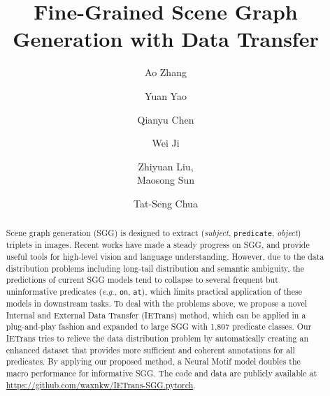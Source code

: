 \documentclass[runningheads]{llncs}
\newcommand{\eg}{\textit{e}.\textit{g}.}
\begin{document}
\pagestyle{headings}
\mainmatter
\def\ECCVSubNumber{2734}  

\title{Fine-Grained Scene Graph Generation with Data Transfer} 

\begin{comment}
\titlerunning{ECCV-22 submission ID \ECCVSubNumber} 
\authorrunning{ECCV-22 submission ID \ECCVSubNumber} 
\author{Anonymous ECCV submission}
\institute{Paper ID \ECCVSubNumber}
\end{comment}


\author{Ao Zhang \and
Yuan Yao \and
Qianyu Chen \and Wei Ji 
\and Zhiyuan Liu, \\ 
 Maosong Sun \and Tat-Seng Chua}

{\let\thefootnote\relax{}}
{\let\thefootnote\relax{}}


\maketitle

\begin{abstract}
Scene graph generation (SGG) is designed to extract (\textit{subject}, \texttt{predicate}, \textit{object}) triplets in images. 
Recent works have made a steady progress on SGG, and provide useful tools for high-level vision and language understanding.
However, due to the data distribution problems including long-tail distribution and semantic ambiguity, the predictions of current SGG models tend to collapse to several frequent but uninformative predicates (\eg, \texttt{on}, \texttt{at}), which limits practical application of these models in downstream tasks. 
To deal with the problems above, we propose a novel Internal and External Data Transfer (IETrans) method, which can be applied in a plug-and-play fashion and expanded to large SGG with 1,807 predicate classes.
Our IETrans tries to relieve the data distribution problem by automatically creating an enhanced dataset that provides more sufficient and coherent annotations for all predicates. 
By applying our proposed method, a Neural Motif model doubles the macro performance for informative SGG.
The code and data are publicly available at \url{https://github.com/waxnkw/IETrans-SGG.pytorch}.
\end{abstract}
\end{document}
